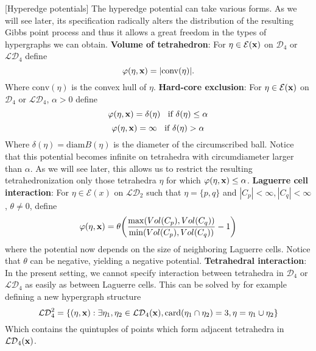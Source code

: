 \begin{ex}\label{ex:potentials}[Hyperedge potentials]
	The hyperedge potential can take various forms. As we will see later, its specification radically alters the distribution of the resulting Gibbs point process and thus it allows a great freedom in the types of hypergraphs we can obtain.\newline
	\textbf{Volume of tetrahedron}: For $\eta\in\mathcal E({\mathbf{x}})$ on $\mathcal D_4$ or $\mathcal {LD}_4$ define
	$$\varphi(\eta,{\mathbf{x}}) = |\mathrm{conv}(\eta)| .$$
	Where $\mathrm{conv}(\eta)$ is the convex hull of $\eta$.	\newline
	\textbf{Hard-core exclusion}: For $\eta\in\mathcal E({\mathbf{x}})$ on $\mathcal D_4$ or $\mathcal {LD}_4$, $\alpha >0$ define
	$$\varphi(\eta,{\mathbf{x}}) = \delta(\eta)\;\; \text{ if } \delta(\eta) \leq \alpha$$
	$$\varphi(\eta,{\mathbf{x}}) = \infty \;\; \text { if } \delta(\eta) > \alpha$$
	Where $\delta(\eta)= \mathrm{diam}B(\eta)$ is the diameter of the circumscribed ball. Notice that this potential becomes infinite on tetrahedra with circumdiameter larger than $\alpha$. As we will see later, this allows us to restrict the resulting tetrahedronization only those tetrahedra $\eta$ for which $\varphi(\eta,{\mathbf{x}}) \leq \alpha$.\newline
	\textbf{Laguerre cell interaction}: For $\eta \in \mathcal E(x)$ on $\mathcal {LD}_2$ such that $\eta=\{p,q\}$ and $|C_p| < \infty, |C_q| < \infty$, $\theta \neq 0$, define
$$\varphi(\eta,{\mathbf{x}}) = \theta \bigg (\frac {\max ( Vol(C_p), Vol(C_q))}{\min(Vol(C_p),Vol(C_q))} - 1\bigg)$$
where the potential now depends on the size of neighboring Laguerre cells. Notice that $\theta$ can be negative, yielding a negative potential. \newline
\textbf{Tetrahedral interaction}: In the present setting, we cannot specify interaction between tetrahedra in $\mathcal D_4$ or $\mathcal {LD}_4$ as easily as between Laguerre cells. This can be solved by for example defining a new hypergraph structure
$$\mathcal {LD}^2_4 = \{(\eta,{\mathbf{x}}): \exists \eta_1,\eta_2\in\mathcal {LD}_4({\mathbf{x}}), \mathrm{card}(\eta_1 \cap \eta_2)=3, \eta = \eta_1 \cup \eta_2\}$$
Which contains the quintuples of points which form adjacent tetrahedra in $\mathcal {LD}_4({\mathbf{x}})$. 
\end{ex}

